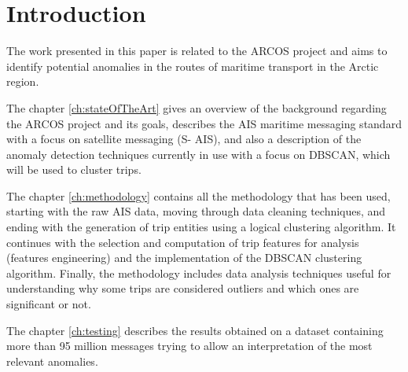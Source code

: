 \chapter*{Introduction}
\label{ch:introduction}

The work presented in this paper is related to the ARCOS project and aims to identify potential anomalies in the routes of maritime transport in the Arctic region.

The chapter \ref{ch:stateOfTheArt} gives an overview of the background regarding the ARCOS project and its goals, describes the AIS maritime messaging standard with a focus on satellite messaging (S- AIS), and also a description of the anomaly detection techniques currently in use with a focus on DBSCAN, which will be used to cluster trips.

The chapter \ref{ch:methodology} contains all the methodology that has been used, starting with the raw AIS data, moving through data cleaning techniques, and ending with the generation of trip entities using a logical clustering algorithm. It continues with the selection and computation of trip features for analysis (features engineering) and the implementation of the DBSCAN clustering algorithm. Finally, the methodology includes data analysis techniques useful for understanding why some trips are considered outliers and which ones are significant or not.

The chapter \ref{ch:testing} describes the results obtained on a dataset containing more than 95 million messages trying to allow an interpretation of the most relevant anomalies.